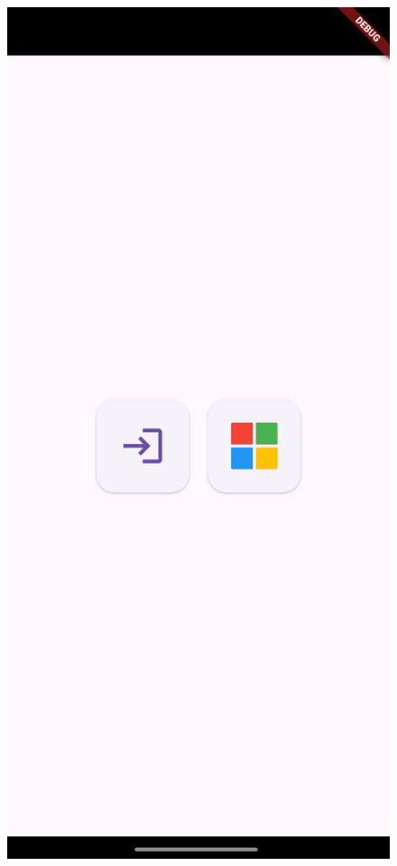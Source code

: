 \documentclass[
  digital,     %
  oneside,     %
  nosansbold,  %
  nocolorbold, %
  lof,         %
  lot,         %
]{fithesis4}
\begin{document}
\begin{center}
\begin{minipage}{0.45\textwidth}
  \begin{figure}[H]
    \centering
    \includegraphics[width=\textwidth]{assets/login_screen.png}

\end{figure}
\end{minipage}
\end{center}
\end{document}
